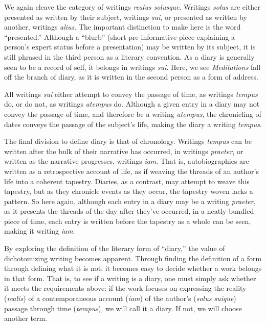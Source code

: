 \documentclass[12pt]{article}[titlepage]
\newcommand{\say}[1]{``#1''}
\newcommand{\1}{\={a}}
\newcommand{\2}{\={e}}
\newcommand{\3}{\={\i}}
\newcommand{\4}{\=o}
\newcommand{\5}{\=u}
\newcommand{\6}{\={A}}
\renewcommand{\,}{\textsuperscript{,}}
\begin{document}
We again cleave the category of writings \textit{realus solusque}.
Writings \textit{solus} are either presented as written by their subject, writings \textit{sui}, or presented as written by another, writings \textit{alius}.
The important distinction to make here is the word \say{presented.}
Although a \say{blurb} (short pre-informative piece explaining a person's expert status before a presentation) may be written by its subject, it is still phrased in the third person as a literary convention.
As a diary is generally seen to be a record of self, it belongs in writings \textit{sui}.
Here, we see \textit{Meditations} fall off the branch of diary, as it is written in the second person as a form of address. 

All writings \textit{sui} either attempt to convey the passage of time, as writings \textit{tempus} do, or do not, as writings \textit{atempus} do.
Although a given entry in a diary may not convey the passage of time, and therefore be a writing \textit{atempus}, the chronicling of dates conveys the passage of the subject's life, making the diary a writing \textit{tempus}.

The final division to define diary is that of chronology.
Writings \textit{tempus} can be written after the bulk of their narrative has occurred, in writings \textit{praeter}, or written as the narrative progresses, writings \textit{iam}.
That is, autobiographies are written as a retrospective account of life, as if weaving the threads of an  author's life into a coherent tapestry.
Diaries, as a contrast, may attempt to weave this tapestry, but as they chronicle events as they occur, the tapestry woven lacks a pattern.
So here again, although each entry in a diary may be a writing \textit{praeter}, as it presents the threads of the day after they've occurred, in a neatly bundled piece of time, each entry is written before the tapestry as a whole can be seen, making it writing \textit{iam}.

By exploring the definition of the literary form of \say{diary,} the value of dichotomizing writing becomes apparent.
Through finding the definition of a form through defining what it is not, it becomes easy to decide whether a work belongs in that form.
That is, to see if a writing is a diary, one must simply ask whether it meets the requirements above: if the work focuses on expressing the reality (\textit{realis}) of a contemporaneous account (\textit{iam}) of the author's (\textit{solus suique}) passage through time (\textit{tempus}), we will call it a diary.
If not, we will choose another term.
\end{document}

